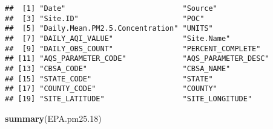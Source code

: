 \documentclass[]{article}
\newenvironment{Shaded}{\begin{snugshade}}{\end{snugshade}}
\newcommand{\KeywordTok}[1]{\textcolor[rgb]{0.13,0.29,0.53}{\textbf{#1}}}
\newcommand{\DecValTok}[1]{\textcolor[rgb]{0.00,0.00,0.81}{#1}}
\newcommand{\NormalTok}[1]{#1}
\begin{document}
\begin{verbatim}
##  [1] "Date"                           "Source"                        
##  [3] "Site.ID"                        "POC"                           
##  [5] "Daily.Mean.PM2.5.Concentration" "UNITS"                         
##  [7] "DAILY_AQI_VALUE"                "Site.Name"                     
##  [9] "DAILY_OBS_COUNT"                "PERCENT_COMPLETE"              
## [11] "AQS_PARAMETER_CODE"             "AQS_PARAMETER_DESC"            
## [13] "CBSA_CODE"                      "CBSA_NAME"                     
## [15] "STATE_CODE"                     "STATE"                         
## [17] "COUNTY_CODE"                    "COUNTY"                        
## [19] "SITE_LATITUDE"                  "SITE_LONGITUDE"
\end{verbatim}

\begin{Shaded}
\begin{Highlighting}[]
\KeywordTok{summary}\NormalTok{(EPA.pm25.}\DecValTok{18}\NormalTok{)}
\end{Highlighting}
\end{Shaded}
\end{document}
